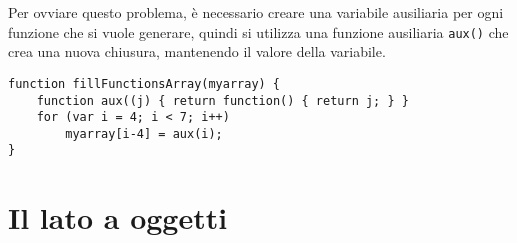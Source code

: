 Per ovviare questo problema, è necessario creare una variabile ausiliaria per ogni funzione che si vuole generare, quindi si utilizza una funzione ausiliaria \texttt{aux()} che crea una nuova chiusura, mantenendo il valore della variabile.
\begin{verbatim}
function fillFunctionsArray(myarray) {
    function aux((j) { return function() { return j; } }
    for (var i = 4; i < 7; i++)
        myarray[i-4] = aux(i);
}
\end{verbatim}

\section{Il lato a oggetti}




































